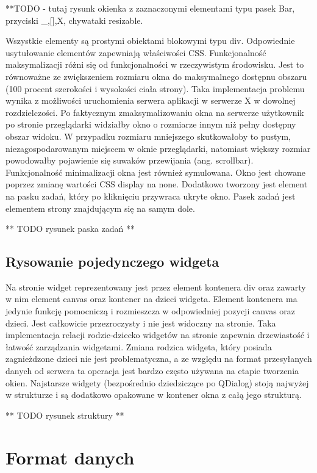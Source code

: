 \documentclass[polish]{inz}
\begin{document}
**TODO - tutaj rysunk okienka z zaznaczonymi elementami typu pasek Bar, przyciski _,[],X, chywataki resizable.

Wszystkie elementy są prostymi obiektami blokowymi typu div. Odpowiednie usytułowanie elementów zapewniają właściwości CSS.
Funkcjonalność maksymalizacji różni się od funkcjonalności w rzeczywistym środowisku. Jest to równoważne ze zwiększeniem rozmiaru okna do maksymalnego dostępnu obszaru (100 procent szerokości i wysokości ciała strony).
Taka implementacja problemu wynika z możliwości uruchomienia serwera aplikacji w serwerze X w dowolnej rozdzielczości. Po faktycznym zmaksymalizowaniu okna na serwerze użytkownik po stronie przeglądarki widziałby okno o rozmiarze innym niż pełny dostępny obszar widoku. W przypadku rozmiaru mniejszego skutkowałoby to pustym, niezagospodarowanym miejscem w oknie przeglądarki, natomiast większy rozmiar powodowałby pojawienie się suwaków przewijania (ang. scrollbar).
Funkcjonalność minimalizacji okna jest również symulowana. Okno jest chowane poprzez zmianę wartości CSS display na none. Dodatkowo tworzony jest element na pasku zadań, który po kliknięciu przywraca ukryte okno. Pasek zadań jest elementem strony znajdującym się na samym dole.

** TODO rysunek paska zadań **

\subsection{Rysowanie pojedynczego widgeta}
Na stronie widget reprezentowany jest przez element kontenera div oraz zawarty w nim element canvas oraz kontener na dzieci widgeta. Element kontenera ma jedynie funkcję pomocniczą i rozmieszcza w odpowiedniej pozycji canvas oraz dzieci. Jest całkowicie przezroczysty i nie jest widoczny na stronie. Taka implementacja relacji rodzic-dziecko widgetów na stronie zapewnia drzewiastość i łatwość zarządzania widgetami. Zmiana rodzica widgeta, który posiada zagnieżdzone dzieci nie jest problematyczna, a ze względu na format przesyłanych danych od serwera ta operacja jest bardzo często używana na etapie tworzenia okien. Najstarsze widgety (bezpośrednio dziedziczące po QDialog) stoją najwyżej w strukturze i są dodatkowo opakowane w kontener okna z całą jego strukturą.

** TODO rysunek struktury **

\section{Format danych}
\end{document}
